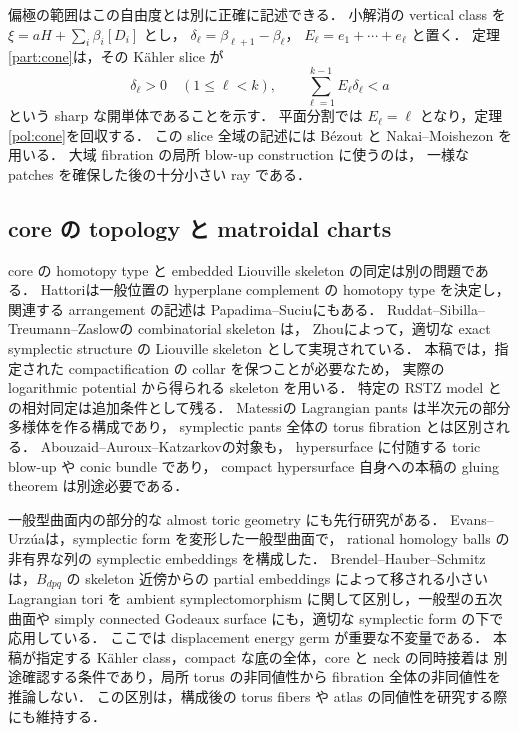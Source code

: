 偏極の範囲はこの自由度とは別に正確に記述できる．
小解消の vertical class を
$\xi=aH+\sum_i\beta_i[D_i]$ とし，
$\delta_\ell=\beta_{\ell+1}-\beta_\ell$，
$E_\ell=e_1+\cdots+e_\ell$ と置く．
定理\ref{part:cone}は，その Kähler slice が
\[
 \delta_\ell>0\quad(1\leq\ell<k),\qquad
 \sum_{\ell=1}^{k-1}E_\ell\delta_\ell<a
\]
という sharp な開単体であることを示す．
平面分割では $E_\ell=\ell$ となり，定理\ref{pol:cone}を回収する．
この slice 全域の記述には Bézout と Nakai--Moishezon を用いる．
大域 fibration の局所 blow-up construction に使うのは，
一様な patches を確保した後の十分小さい ray である．

\subsection{core の topology と matroidal charts}

core の homotopy type と embedded Liouville skeleton の同定は別の問題である．
Hattori\cite{Hattori}は一般位置の hyperplane complement の homotopy type を決定し，
関連する arrangement の記述は Papadima--Suciu\cite[\S1.1]{PapadimaSuciu}にもある．
Ruddat--Sibilla--Treumann--Zaslow\cite{RSTZ}の combinatorial skeleton は，
Zhou\cite{Zhou}によって，適切な exact symplectic structure の
Liouville skeleton として実現されている．
本稿では，指定された compactification の collar を保つことが必要なため，
実際の logarithmic potential から得られる skeleton を用いる．
特定の RSTZ model との相対同定は追加条件として残る．
Matessi\cite{MatessiPants,Matessi}の Lagrangian pants は半次元の部分多様体を作る構成であり，
symplectic pants 全体の torus fibration とは区別される．
Abouzaid--Auroux--Katzarkov\cite{AAK}の対象も，
hypersurface に付随する toric blow-up や conic bundle であり，
compact hypersurface 自身への本稿の gluing theorem は別途必要である．

一般型曲面内の部分的な almost toric geometry にも先行研究がある．
Evans--Urz\'ua\cite{EvansUrzua}は，symplectic form を変形した一般型曲面で，
rational homology balls の非有界な列の symplectic embeddings を構成した．
Brendel--Hauber--Schmitz\cite{BHS}は，$B_{dpq}$ の skeleton 近傍からの
partial embeddings によって移される小さい Lagrangian tori を
ambient symplectomorphism に関して区別し，一般型の五次曲面や
simply connected Godeaux surface にも，適切な symplectic form の下で応用している．
ここでは displacement energy germ が重要な不変量である．
本稿が指定する K\"ahler class，compact な底の全体，core と neck の同時接着は
別途確認する条件であり，局所 torus の非同値性から fibration 全体の非同値性を推論しない．
この区別は，構成後の torus fibers や atlas の同値性を研究する際にも維持する．

